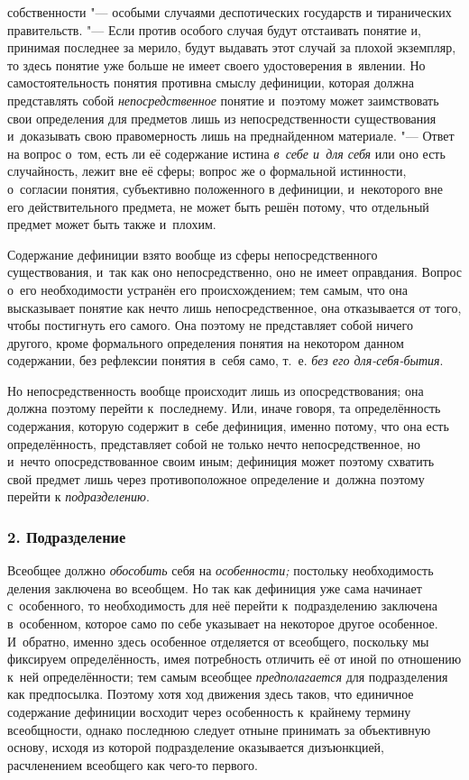 собственности "--- особыми случаями деспотических государств и
тиранических правительств. "--- Если против особого случая
будут отстаивать понятие и, принимая последнее за мерило, будут выдавать
этот случай за плохой экземпляр, то здесь понятие уже больше не имеет
своего удостоверения в~явлении. Но самостоятельность понятия противна
смыслу дефиниции, которая должна представлять собой
{\em непосредственное}
понятие и~поэтому может заимствовать свои определения для
предметов лишь из непосредственности существования и~доказывать свою
правомерность лишь на преднайденном материале. "--- Ответ на
вопрос о~том, есть ли её содержание истина
{\em в~себе и~для себя}
или оно есть случайность, лежит вне её сферы; вопрос же о
формальной истинности, о~согласии понятия, субъективно положенного в
дефиниции, и~некоторого вне его действительного предмета, не может быть
решён потому, что отдельный предмет может быть также и~плохим.

Содержание дефиниции взято вообще из сферы непосредственного
существования, и~так как оно непосредственно, оно не имеет оправдания.
Вопрос о~его необходимости устранён его происхождением; тем самым, что она
высказывает понятие как нечто лишь непосредственное, она отказывается от
того, чтобы постигнуть его самого. Она поэтому не представляет собой ничего
другого, кроме формального определения понятия на некотором данном
содержании, без рефлексии понятия в~себя само, т.~е.
{\em без его для-себя-бытия}.

Но непосредственность вообще происходит лишь из
опосредствования; она должна поэтому перейти к~последнему. Или,
иначе говоря, та определённость содержания, которую содержит
в~себе дефиниция, именно потому, что она есть определённость, представляет
собой не только нечто непосредственное, но и~нечто опосредствованное своим
иным; дефиниция может поэтому схватить свой предмет лишь через
противоположное определение и~должна поэтому перейти к
{\em подразделению}.

\subsubsection[2. Подразделение]{\bfseries 2. Подразделение}

Всеобщее должно {\em обособить} себя на {\em особенности;}
постольку необходимость деления заключена во всеобщем. Но так
как дефиниция уже сама начинает с~особенного, то необходимость для неё
перейти к~подразделению заключена в~особенном, которое само по себе
указывает на некоторое другое особенное. И~обратно, именно здесь особенное
отделяется от всеобщего, поскольку мы фиксируем определённость, имея
потребность отличить её от иной по отношению к~ней определённости; тем
самым всеобщее {\em предполагается}
для подразделения как предпосылка. Поэтому хотя ход движения
здесь таков, что единичное содержание дефиниции восходит через особенность
к~крайнему термину всеобщности, однако последнюю следует отныне принимать
за объективную основу, исходя из которой подразделение оказывается
дизъюнкцией, расчленением всеобщего как чего-то первого.

